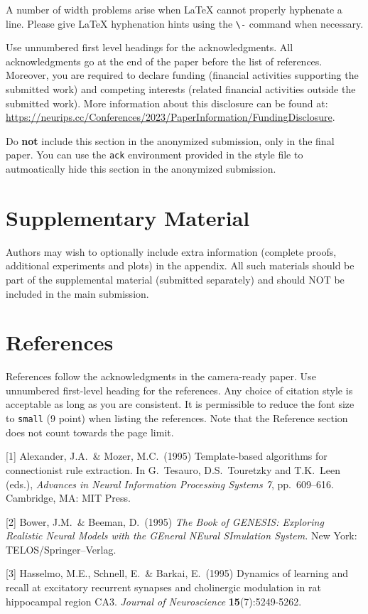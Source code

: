 \documentclass{article}
\begin{document}
A number of width problems arise when \LaTeX{} cannot properly hyphenate a
line. Please give LaTeX hyphenation hints using the \verb+\-+ command when
necessary.


\begin{ack}
Use unnumbered first level headings for the acknowledgments. All acknowledgments
go at the end of the paper before the list of references. Moreover, you are required to declare
funding (financial activities supporting the submitted work) and competing interests (related financial activities outside the submitted work).
More information about this disclosure can be found at: \url{https://neurips.cc/Conferences/2023/PaperInformation/FundingDisclosure}.


Do {\bf not} include this section in the anonymized submission, only in the final paper. You can use the \texttt{ack} environment provided in the style file to autmoatically hide this section in the anonymized submission.
\end{ack}



\section{Supplementary Material}

Authors may wish to optionally include extra information (complete proofs, additional experiments and plots) in the appendix. All such materials should be part of the supplemental material (submitted separately) and should NOT be included in the main submission.


\section*{References}


References follow the acknowledgments in the camera-ready paper. Use unnumbered first-level heading for
the references. Any choice of citation style is acceptable as long as you are
consistent. It is permissible to reduce the font size to \verb+small+ (9 point)
when listing the references.
Note that the Reference section does not count towards the page limit.
\medskip


{
\small


[1] Alexander, J.A.\ \& Mozer, M.C.\ (1995) Template-based algorithms for
connectionist rule extraction. In G.\ Tesauro, D.S.\ Touretzky and T.K.\ Leen
(eds.), {\it Advances in Neural Information Processing Systems 7},
pp.\ 609--616. Cambridge, MA: MIT Press.


[2] Bower, J.M.\ \& Beeman, D.\ (1995) {\it The Book of GENESIS: Exploring
  Realistic Neural Models with the GEneral NEural SImulation System.}  New York:
TELOS/Springer--Verlag.


[3] Hasselmo, M.E., Schnell, E.\ \& Barkai, E.\ (1995) Dynamics of learning and
recall at excitatory recurrent synapses and cholinergic modulation in rat
hippocampal region CA3. {\it Journal of Neuroscience} {\bf 15}(7):5249-5262.
}

\end{document}
